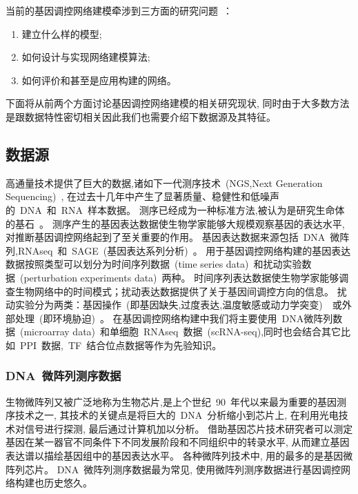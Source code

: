 当前的基因调控网络建模牵涉到三方面的研究问题~\cite{schlitt2007current}：
\begin{enumerate}
    \item 建立什么样的模型;
    \item 如何设计与实现网络建模算法;
    \item 如何评价和甚至是应用构建的网络。
\end{enumerate}
下面将从前两个方面讨论基因调控网络建模的相关研究现状,
同时由于大多数方法是跟数据特性密切相关因此我们也需要介绍下数据源及其特征。

\subsection{数据源}
高通量技术提供了巨大的数据,诸如下一代测序技术~(NGS,Next Generation Sequencing)~\cite{BUERMANS20141932}, 
在过去十几年中产生了显著质量、稳健性和低噪声的~DNA~和~RNA~样本数据。
测序已经成为一种标准方法,被认为是研究生命体的基石~\cite{CEREB2015923}。
测序产生的基因表达数据使生物学家能够大规模观察基因的表达水平, 对推断基因调控网络起到了至关重要的作用。
基因表达数据来源包括~DNA~微阵列,RNAseq~\cite{morin2008profiling}和~SAGE~(基因表达系列分析)~\cite{velculescu1995serial}。
用于基因调控网络构建的基因表达数据按照类型可以划分为时间序列数据~(time series data)~和扰动实验数据~(perturbation experiments data)~两种。
时间序列表达数据使生物学家能够调查生物网络中的时间模式；扰动表达数据提供了关于基因间调控方向的信息。
扰动实验分为两类：基因操作~(即基因缺失,过度表达,温度敏感或动力学突变)~\cite{holstege1998dissecting}~或外部处理~(即环境胁迫)~\cite{gasch2000genomic}。
在基因调控网络构建中我们将主要使用~DNA微阵列数据~(microarray data)~和单细胞~RNAseq~数据~(scRNA-seq),同时也会结合其它比如~PPI~数据,~TF~结合位点数据等作为先验知识。

\subsubsection{DNA~微阵列测序数据}
生物微阵列又被广泛地称为生物芯片,是上个世纪~90~年代以来最为重要的基因测序技术之一,
其技术的关键点是将巨大的~DNA~分析缩小到芯片上, 在利用光电技术对信号进行探测, 最后通过计算机加以分析。
借助基因芯片技术研究者可以测定基因在某一器官不同条件下不同发展阶段和不同组织中的转录水平,
从而建立基因表达谱以描绘基因组中的基因表达水平。
各种微阵列技术中, 用的最多的是基因微阵列芯片。
DNA~微阵列测序数据最为常见, 使用微阵列测序数据进行基因调控网络构建也历史悠久。

